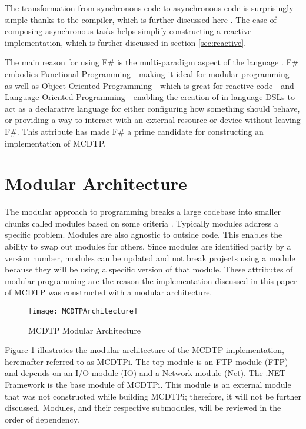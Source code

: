 The transformation from synchronous code to asynchronous code is surprisingly simple thanks to the compiler, which is further discussed here \cite{syme2011f}. The ease of composing asynchronous tasks helps simplify constructing a reactive implementation, which is further discussed in section \ref{sec:reactive}.

The main reason for using F\# is the multi-paradigm aspect of the language \cite{Petricek}. F\# embodies Functional Programming---making it ideal for modular programming---as well as Object-Oriented Programming---which is great for reactive code---and Language Oriented Programming---enabling the creation of in-language DSLs to act as a declarative language for either configuring how something should behave, or providing a way to interact with an external resource or device without leaving F\#. This attribute has made F\# a prime candidate for constructing an implementation of MCDTP.

\section {Modular Architecture}

The modular approach to programming breaks a large codebase into smaller chunks called modules based on some criteria \cite{Microsystems2007}. Typically modules address a specific problem. Modules are also agnostic to outside code. This enables the ability to swap out modules for others. Since modules are identified partly by a version number, modules can be updated and not break projects using a module because they will be using a specific version of that module. These attributes of modular programming are the reason the implementation discussed in this paper of MCDTP was constructed with a modular architecture.

\begin{figure}[ht]
\centering
\texttt{[image: MCDTPArchitecture]}
\caption{MCDTP Modular Architecture}
\label{fig:mcdtp-arch}
\end{figure}

Figure \ref{fig:mcdtp-arch} illustrates the modular architecture of the MCDTP implementation, hereinafter referred to as MCDTPi. The top module is an FTP module (FTP) and depends on an I/O module (IO) and a Network module (Net). The .NET Framework is the base module of MCDTPi. This module is an external module that was not constructed while building MCDTPi; therefore, it will not be further discussed. Modules, and their respective submodules, will be reviewed in the order of dependency.


